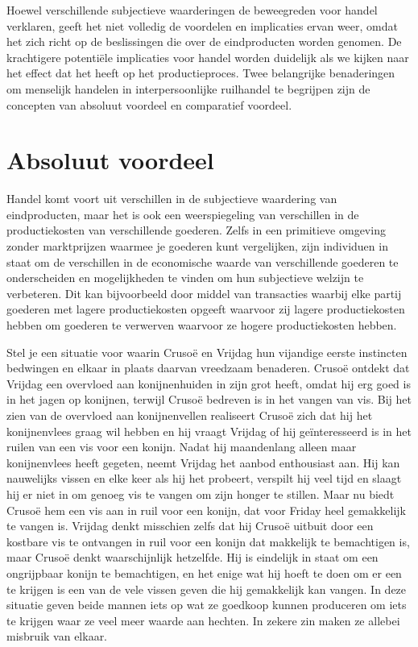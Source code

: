 Hoewel verschillende subjectieve waarderingen de beweegreden voor handel verklaren, geeft het niet volledig de voordelen en implicaties ervan weer, omdat het zich richt op de beslissingen die over de eindproducten worden genomen. De krachtigere potentiële implicaties voor handel worden duidelijk als we kijken naar het effect dat het heeft op het productieproces. Twee belangrijke benaderingen om menselijk handelen in interpersoonlijke ruilhandel te begrijpen zijn de concepten van absoluut voordeel en comparatief voordeel.

\hypertarget{absoluut-voordeel}{%
\section{Absoluut voordeel}\label{absoluut-voordeel}}

Handel komt voort uit verschillen in de subjectieve waardering van eindproducten, maar het is ook een weerspiegeling van verschillen in de productiekosten van verschillende goederen. Zelfs in een primitieve omgeving zonder marktprijzen waarmee je goederen kunt vergelijken, zijn individuen in staat om de verschillen in de economische waarde van verschillende goederen te onderscheiden en mogelijkheden te vinden om hun subjectieve welzijn te verbeteren. Dit kan bijvoorbeeld door middel van transacties waarbij elke partij goederen met lagere productiekosten opgeeft waarvoor zij lagere productiekosten hebben  om goederen te verwerven waarvoor ze hogere productiekosten hebben.

Stel je een situatie voor waarin Crusoë en Vrijdag hun vijandige eerste instincten bedwingen en elkaar in plaats daarvan vreedzaam benaderen. Crusoë ontdekt dat Vrijdag een overvloed aan konijnenhuiden in zijn grot heeft, omdat hij erg goed is in het jagen op konijnen, terwijl Crusoë bedreven is in het vangen van vis. Bij het zien van de overvloed aan konijnenvellen realiseert Crusoë zich dat hij het konijnenvlees graag wil hebben en hij vraagt Vrijdag of hij geïnteresseerd is in het ruilen van een vis voor een konijn. Nadat hij maandenlang alleen maar konijnenvlees heeft gegeten, neemt Vrijdag het aanbod enthousiast aan. Hij kan nauwelijks vissen en elke keer als hij het probeert, verspilt hij veel tijd en slaagt hij er niet in om genoeg vis te vangen om zijn honger te stillen. Maar nu biedt Crusoë hem een vis aan in ruil voor een konijn, dat voor Friday heel gemakkelijk te vangen is. Vrijdag denkt misschien zelfs dat hij Crusoë uitbuit door een kostbare vis te ontvangen in ruil voor een konijn dat makkelijk te bemachtigen is, maar Crusoë denkt waarschijnlijk hetzelfde. Hij is eindelijk in staat om een ongrijpbaar konijn te bemachtigen, en het enige wat hij hoeft te doen om er een te krijgen is een van de vele vissen geven die hij gemakkelijk kan vangen. In deze situatie geven beide mannen iets op wat ze goedkoop kunnen produceren om iets te krijgen waar ze veel meer waarde aan hechten. In zekere zin maken ze allebei misbruik van elkaar.

